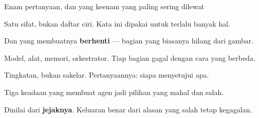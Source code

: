 \documentclass[aspectratio=169,11pt,t]{beamer}
\begin{document}
\begin{frame}[shrink=25]{Enam pertanyaan, dan yang keenam yang paling sering dilewat}
\begin{minipage}[t]{0.3253\textwidth}
\begin{icard}
Satu sifat, bukan daftar ciri. Kata ini dipakai untuk terlalu banyak hal.
\end{icard}
\end{minipage}%
\hfill
\begin{minipage}[t]{0.3253\textwidth}
\begin{icard}
Dan yang membuatnya \textbf{berhenti} --- bagian yang biasanya hilang dari gambar.
\end{icard}
\end{minipage}%
\hfill
\begin{minipage}[t]{0.3253\textwidth}
\begin{icard}
Model, alat, memori, orkestrator. Tiap bagian gagal dengan cara yang berbeda.
\end{icard}
\end{minipage}%


\vskip 4pt

\begin{minipage}[t]{0.3253\textwidth}
\begin{icard}
Tingkatan, bukan sakelar. Pertanyaannya: siapa menyetujui apa.
\end{icard}
\end{minipage}%
\hfill
\begin{minipage}[t]{0.3253\textwidth}
\begin{icard}
Tiga keadaan yang membuat agen jadi pilihan yang mahal dan salah.
\end{icard}
\end{minipage}%
\hfill
\begin{minipage}[t]{0.3253\textwidth}
\begin{icard}
Dinilai dari \textbf{jejaknya}. Keluaran benar dari alasan yang salah tetap kegagalan.
\end{icard}
\end{minipage}%
\end{frame}

\end{document}
